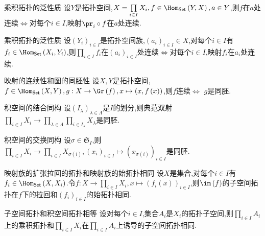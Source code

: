 \begin{proposition}{乘积拓扑的泛性质}{}
	设$Y$是拓扑空间,$X=\prod\limits_{i\in I}X_{i},f\in\Hom_{\mathsf{Set}}\left(Y,X\right),a\in Y$,则$f$在$a$处连续$\iff$对每个$i\in I$,映射$\pr_{i}\circ f$在$a$处连续.
\end{proposition}

\begin{corollary}{乘积拓扑的泛性质}{}
	设$\left(Y_{i}\right)_{i\in I}$是拓扑空间族,$\left(a_{i}\right)_{i\in I}\in X$,对每个$i\in I$有$f_{i}\in\Hom_{\mathsf{Set}}\left(X_{i},Y_{i}\right)$,则$\prod\limits_{i\in I}f_{i}$在$\left(a_{i}\right)_{i\in I}$处连续$\iff$对每个$i\in I$,映射$f_{i}$在$a_{i}$处连续.
\end{corollary}

\begin{corollary}{映射的连续性和图的同胚性}{}
	设$X,Y$是拓扑空间,$f\in\Hom_{\mathsf{Set}}\left(X,Y\right),g:X\to\Gr\left(f\right),x\mapsto\left(x,f\left(x\right)\right)$,则$f$连续$\iff$ $g$是同胚.
\end{corollary}

\begin{proposition}{积空间的结合同构}{}
	设$\left(I_{\lambda}\right)_{\lambda\in\Lambda}$是$I$的划分,则典范双射$\prod\limits_{i\in I}X_{i}\to\prod\limits_{\lambda\in\Lambda}\prod\limits_{i\in I_{\lambda}}X_{\lambda}$是同胚.
\end{proposition}

\begin{corollary}{积空间的交换同构}{}
	设$\sigma\in\mathfrak{S}_{I}$,则$\prod\limits_{i\in I}X_{i}\to\prod\limits_{i\in I}X_{\sigma\left(i\right)},\left(x_{i}\right)_{i\in I}\mapsto\left(x_{\sigma\left(i\right)}\right)_{i\in I}$是同胚.
\end{corollary}

\begin{proposition}{映射族的扩张拉回的拓扑和映射族的始拓扑相同}{}
	设$X$是集合,对每个$i\in I$有$f_{i}\in\Hom_{\mathsf{Set}}\left(X,X_{i}\right)$.令$f:X\to\prod\limits_{i\in I}X_{i},x\mapsto\left(f_{i}\left(x\right)\right)_{i\in I}$,则$\im\left(f\right)$的子空间拓扑在$f$下的拉回和$\left(f_{i}\right)_{i\in I}$的始拓扑相同.
\end{proposition}

\begin{corollary}{子空间拓扑和积空间拓扑相等}{}
	设对每个$i\in I$,集合$A_{i}$是$X_{i}$的拓扑子空间,则$\prod\limits_{i\in I}A_{i}$上的乘积拓扑和$\prod\limits_{i\in I}X_{i}$在$\prod\limits_{i\in I}A_{i}$上诱导的子空间拓扑相同.
\end{corollary}
